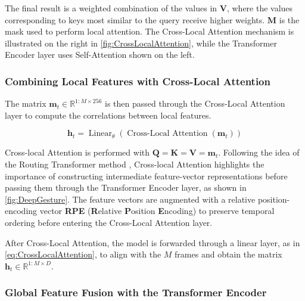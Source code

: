 The final result is a weighted combination of the values in \( \mathbf{V} \), where the values corresponding to keys most similar to the query receive higher weights. $\mathbf{M}$ is the mask used to perform local attention. The Cross-Local Attention mechanism is illustrated on the right in \autoref{fig:CrossLocalAttention}, while the Transformer Encoder layer uses Self-Attention shown on the left.

\subsubsection{Combining Local Features with Cross-Local Attention}


The matrix $\mathbf{m}_{t} \in \mathbb{R}^{1:M \times 256}$ is then passed through the Cross-Local Attention layer to compute the correlations between local features.


\begin{equation}
	\mathbf{h}_{t}  = \operatorname{Linear}_{\theta}  ( \operatorname{Cross-Local\ Attention}( \mathbf{m}_{t}) )
	\label{eq:CrossLocalAttention}
\end{equation}


Cross-local Attention is performed with $\mathbf{Q} = \mathbf{K} = \mathbf{V} = \mathbf{m}_{t}$.
Following the idea of the Routing Transformer method \cite{roy2021efficient}, Cross-local Attention highlights the importance of constructing intermediate feature-vector representations before passing them through the Transformer Encoder layer, as shown in \autoref{fig:DeepGesture}.
The feature vectors are augmented with a relative position-encoding vector \textbf{RPE} (\textbf{R}elative \textbf{P}osition \textbf{E}ncoding) to preserve temporal ordering before entering the Cross-Local Attention layer.

After Cross-Local Attention, the model is forwarded through a linear layer, as in \autoref{eq:CrossLocalAttention}, to align with the $M$ frames and obtain the matrix $\mathbf{h}_t \in \mathbb{R}^{1:M \times D}$.

\subsubsection{Global Feature Fusion with the Transformer Encoder}

